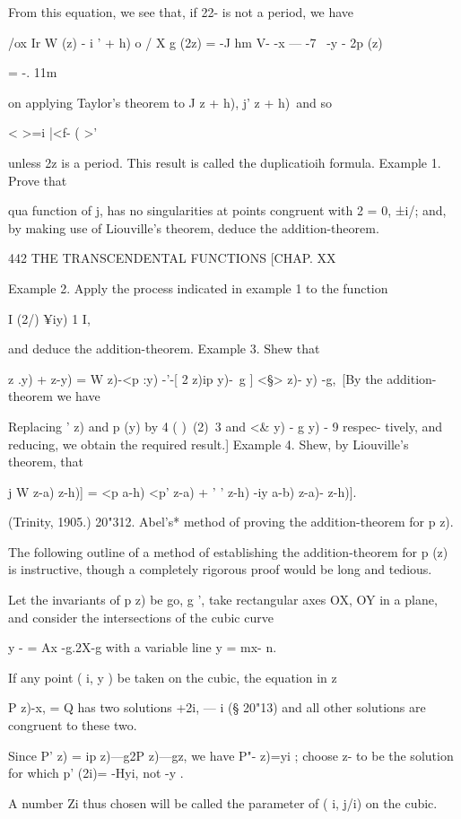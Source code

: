 {From this equation, we see that, if 22- is not a period, we have

/ox Ir W (z) - i ' + h) o / X g (2z) = -J hm V- -x — -7 ~-y - 2p (z)

= -. 11m

on applying Taylor's theorem to J z + h), j' z + h)\ and so

 < >=i |<f- ( >'

unless 2z is a period. This result is called the duplicatioih formula.
Example 1. Prove that

qua function of j, has no singularities at points congruent with 2 =
0, ±i/; and, by making use of Liouville's theorem, deduce the
addition-theorem.

442 THE TRANSCENDENTAL FUNCTIONS [CHAP. XX

Example 2. Apply the process indicated in example 1 to the function

I (2/) ¥iy) 1 I,

and deduce the addition-theorem. Example 3. Shew that

  z .y) + z-y) = W z)-<p :y) -'-[ 2 z)ip y)-\ g ] <§> z)- y) -g,\ [By
the addition-theorem we have

Replacing ' z) and p (y) by 4 ( )\ (2)\ 3 and <\& y) - g y) - 9
respec- tively, and reducing, we obtain the required result.] Example
4. Shew, by Liouville's theorem, that

j W z-a) z-h)] = <p a-h) <p' z-a) + ' ' z-h) -iy a-b) z-a)- z-h)].

(Trinity, 1905.) 20"312. Abel's* method of proving the
addition-theorem for p z).

The following outline of a method of establishing the addition-theorem
for p (z) is instructive, though a completely rigorous proof would be
long and tedious.

Let the invariants of p z) be go, g ', take rectangular axes OX, OY in
a plane, and consider the intersections of the cubic curve

y - = Ax -g.2X-g with a variable line y = mx- n.

If any point ( i, y ) be taken on the cubic, the equation in z

P z)-x, = Q has two solutions +2i, — i (§ 20"13) and all other
solutions are congruent to these two.

Since P' z) = ip z)—g2P z)—gz, we have P"- z)=yi ; choose z- to be the
solution for which p' (2i)= -Hyi, not -y .

A number Zi thus chosen will be called the parameter of ( i, j/i) on
the cubic.

}
